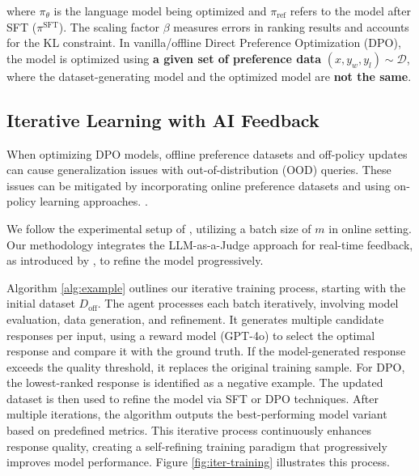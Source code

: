 \documentclass[11pt]{article}
\begin{document}
where $\pi_\theta$ is the language model being optimized and $\pi_{\mathrm{ref}}$ refers to the model after SFT ($\pi^{\mathrm{SFT}}$). The scaling factor $\beta$ measures errors in ranking results and accounts for the KL constraint. In vanilla/offline Direct Preference Optimization (DPO), the model is optimized using \textbf{a given set of preference data} \((x, y_w, y_l) \sim \mathcal{D}\), where the dataset-generating model and the optimized model are \textbf{not the same}.

\subsection{Iterative Learning with AI Feedback}
When optimizing DPO models, offline preference datasets and off-policy updates can cause generalization issues with out-of-distribution (OOD) queries. These issues can be mitigated by incorporating online preference datasets and using on-policy learning approaches. \cite{guo-direct,xiong-iterative,rlfh-workflow}.

We follow the experimental setup of \cite{xiong-iterative}, utilizing a batch size of $m$ in online setting. Our methodology integrates the LLM-as-a-Judge approach for real-time feedback, as introduced by \cite{llm-as-a-judge}, to refine the model progressively.

Algorithm \ref{alg:example} outlines our iterative training process, starting with the initial dataset $D_\text{off}$. The agent processes each batch iteratively, involving model evaluation, data generation, and refinement. It generates multiple candidate responses per input, using a reward model (GPT-4o) to select the optimal response and compare it with the ground truth. If the model-generated response exceeds the quality threshold, it replaces the original training sample. For DPO, the lowest-ranked response is identified as a negative example. The updated dataset is then used to refine the model via SFT or DPO techniques. After multiple iterations, the algorithm outputs the best-performing model variant based on predefined metrics. This iterative process continuously enhances response quality, creating a self-refining training paradigm that progressively improves model performance. Figure \ref{fig:iter-training} illustrates this process.
\end{document}
